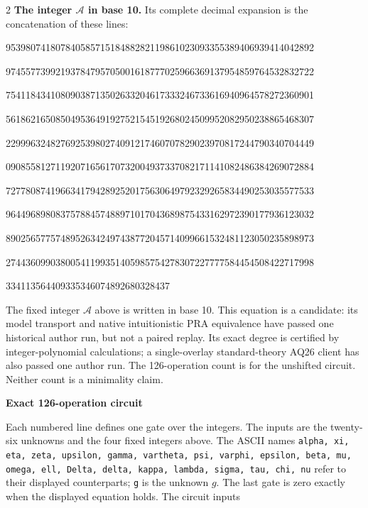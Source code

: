 \documentclass[10pt]{article}
\begin{document}
\begin{multicols}{2}
\textbf{The integer $\mathcal A$ in base 10.}
Its complete decimal expansion is the concatenation of these lines:\par
\begingroup\fontsize{7.7}{8.2}\selectfont{}\par
95398074180784058571518488282119861023093355389406939414042892\par
97455773992193784795705001618777025966369137954859764532832722\par
75411843410809038713502633204617333246733616940964578272360901\par
56186216508504953649192752154519268024509952082950238865468307\par
22999632482769253980274091217460707829023970817244790340704449\par
09085581271192071656170732004937337082171141082486384269072884\par
72778087419663417942892520175630649792329265834490253035577533\par
96449689808375788457488971017043689875433162972390177936123032\par
89025657757489526342497438772045714099661532481123050235898973\par
27443609903800541199351405985754278307227777584454508422717998\par
334113564409335346074892680328437\par
\endgroup
\normalfont\fontsize{7.7}{8.2}\selectfont
The fixed integer $\mathcal A$ above is written in base 10. This equation is a candidate: its model transport and native intuitionistic PRA equivalence have passed one historical author run, but not a paired replay. Its exact degree is certified by integer-polynomial calculations;
a single-overlay standard-theory AQ26 client has also passed one author run. The 126-operation count is for the unshifted circuit. Neither count is a
minimality claim.
\end{multicols}
\clearpage
\begin{center}{\large\bfseries Exact 126-operation circuit}\end{center}
Each numbered line defines one gate over the integers. The inputs are the
twenty-six unknowns and the four fixed integers above. The ASCII names
\texttt{alpha, xi, eta, zeta, upsilon, gamma, vartheta, psi, varphi, epsilon, beta, mu, omega, ell, Delta, delta, kappa, lambda, sigma, tau, chi, nu}
refer to their displayed counterparts; \texttt{g} is the unknown $g$. The last
gate is zero exactly when the displayed equation holds. The circuit inputs
\end{document}
